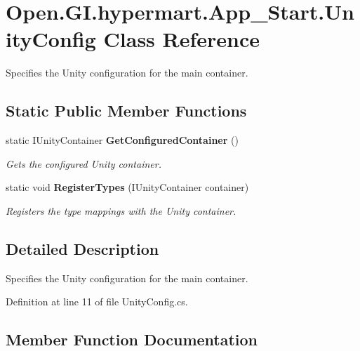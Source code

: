 \section{Open.\+G\+I.\+hypermart.\+App\+\_\+\+Start.\+Unity\+Config Class Reference}
\label{class_open_1_1_g_i_1_1hypermart_1_1_app___start_1_1_unity_config}


Specifies the Unity configuration for the main container.  


\subsection*{Static Public Member Functions}
\begin{DoxyCompactItemize}
\item 
static I\+Unity\+Container \textbf{ Get\+Configured\+Container} ()
\begin{DoxyCompactList}\small\item\em Gets the configured Unity container. \end{DoxyCompactList}\item 
static void \textbf{ Register\+Types} (I\+Unity\+Container container)
\begin{DoxyCompactList}\small\item\em Registers the type mappings with the Unity container.\end{DoxyCompactList}\end{DoxyCompactItemize}


\subsection{Detailed Description}
Specifies the Unity configuration for the main container. 



Definition at line 11 of file Unity\+Config.\+cs.



\subsection{Member Function Documentation}
\mbox{\label{class_open_1_1_g_i_1_1hypermart_1_1_app___start_1_1_unity_config_a5ef8083dd9a90a437da3fc2ddcc11ce3}} 
